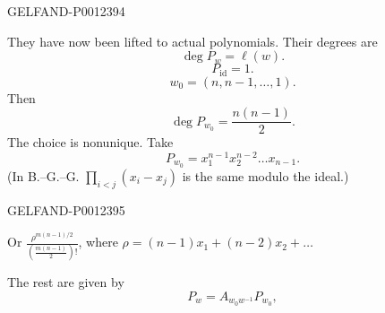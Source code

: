 \begin{GelfandAdjacentEvidence}{GELFAND-P001239}{4}

They have now been lifted to actual polynomials. Their degrees are
\begin{equation*}
\operatorname{deg} P_w=\ell(w).
\end{equation*}
\begin{equation*}
P_{\mathrm{id}}=1.
\end{equation*}
\begin{equation*}
w_0=(n,n-1,\ldots,1).
\end{equation*}
Then
\begin{equation*}
\operatorname{deg} P_{w_0}=\frac{n(n-1)}{2}.
\end{equation*}
The choice is nonunique. Take
\begin{equation*}
P_{w_0}=x_1^{n-1}x_2^{n-2}\ldots x_{n-1}.
\end{equation*}
(In B.–G.–G. $\displaystyle\prod_{i<j}(x_i-x_j)$ is the same modulo the ideal.)
\end{GelfandAdjacentEvidence}
\begin{GelfandAdjacentEvidence}{GELFAND-P001239}{5}


Or $\displaystyle\frac{\rho^{m(n-1)/2}}{\left(\frac{m(n-1)}{2}\right)!}$, where $\rho=(n-1)x_1+(n-2)x_2+\ldots$
\end{GelfandAdjacentEvidence}


The rest are given by
\begin{equation*}
P_w=A_{w_0w^{-1}}P_{w_0},
\end{equation*}


